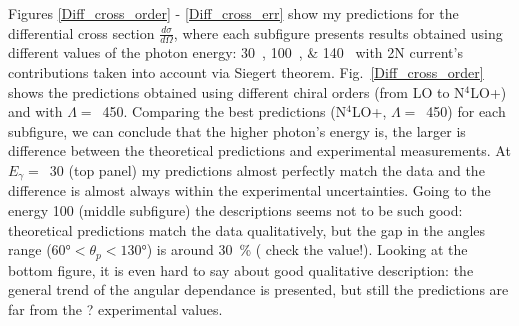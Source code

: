         
    Figures \ref{Diff_cross_order} - \ref{Diff_cross_err} show my predictions for the differential cross section
    $\frac{d\sigma}{d\Omega}$, where each subfigure 
    presents results obtained using different values of the photon energy:
    \SIlist[list-units = single]{30;100;140}{\mev}
    with 2N current's contributions taken into account via Siegert theorem. 
    Fig.~\ref{Diff_cross_order} shows the predictions obtained using 
    different chiral orders (from LO to N$^4$LO+) and with $\Lambda=$~\SI{450}{\mev}.
    Comparing the best predictions (N$^4$LO+, $\Lambda=$~\SI{450}{\mev}) for each
    subfigure, we can
    conclude that the higher photon's energy is, the larger is 
    difference between the theoretical predictions and experimental 
    measurements. At $E_\gamma = $~\SI{30}{\mev} (top panel) my predictions
    almost perfectly match the data and the difference is almost always
    within the experimental uncertainties. Going to the energy \SI{100}{\mev} (middle subfigure)
    the descriptions seems not to be such good: theoretical
    predictions match the data qualitatively, but
    the gap in the angles range ($\ang{60} < \theta_p < \ang{130}$) 
    is around \SI{30}{\percent} ({\color{red} check the value!}).
    Looking at the bottom figure, it is even hard to say about 
    good qualitative description: the general trend of the
    angular dependance is presented, but still the predictions are 
    far from {\color{red} the ?} experimental values.

